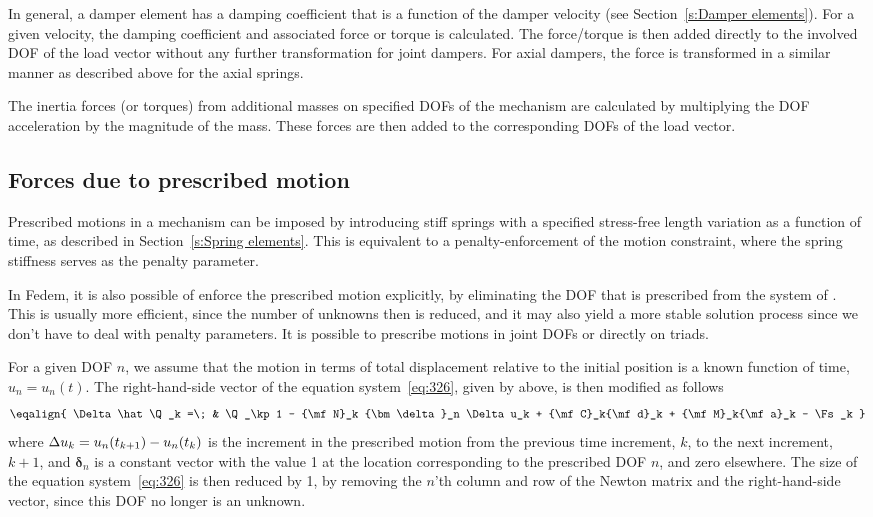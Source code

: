 In general, a damper element has a damping coefficient that is a function of the
damper velocity (see Section~\ref{s:Damper elements}).
For a given velocity, the damping coefficient and associated force or
torque is calculated.
The force/torque is then added directly to the involved DOF of the load vector
without any further transformation for joint dampers.
For axial dampers, the force is transformed in a similar manner as described
above for the axial springs.

The inertia forces (or torques) from additional masses on specified DOFs of the
mechanism are calculated by multiplying the DOF acceleration by the magnitude
of the mass.
These forces are then added to the corresponding DOFs of the load vector.

\subsection{Forces due to prescribed motion}

Prescribed motions in a mechanism can be imposed by introducing stiff springs
with a specified stress-free length variation as a function of time,
as described in Section~\ref{s:Spring elements}.
This is equivalent to a penalty-enforcement of the motion constraint,
where the spring stiffness serves as the penalty parameter.

In Fedem, it is also possible of enforce the prescribed motion explicitly,
by eliminating the DOF that is prescribed from the system of
.
This is usually more efficient, since the number of unknowns then is reduced,
and it may also yield a more stable solution process since we don't have to
deal with penalty parameters.
It is possible to prescribe motions in joint DOFs or directly on triads.

For a given DOF $n$, we assume that the motion in terms of total displacement
relative to the initial position is a known function of time, $u_n = u_n(t)$.
%
The right-hand-side vector of the equation system~\eqref{eq:326}, given by
 above, is then modified as follows
%
\begin{equation}
\eqalign{
\Delta\hat\Q_k =\; &
\Q_\kp1 - {\mf N}_k {\bm\delta}_n \Delta u_k +
{\mf C}_k{\mf d}_k + {\mf M}_k{\mf a}_k - \Fs_k
}\label{eq:352}
\end{equation}
%
where $\Delta u_k = u_n(t_\kp1) - u_n(t_k)$ is the increment in the prescribed
motion from the previous time increment, $k$, to the next increment, $k+1$,
and ${\bm\delta}_n$ is a constant vector with the value 1 at the location
corresponding to the prescribed DOF $n$, and zero elsewhere.
The size of the equation system~\eqref{eq:326} is then reduced by 1, by removing
the $n$'th column and row of the Newton matrix and the right-hand-side vector,
since this DOF no longer is an unknown.

